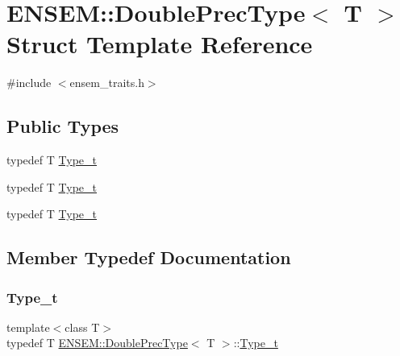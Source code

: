 \hypertarget{structENSEM_1_1DoublePrecType}{}\section{E\+N\+S\+EM\+:\+:Double\+Prec\+Type$<$ T $>$ Struct Template Reference}
\label{structENSEM_1_1DoublePrecType}


{\ttfamily \#include $<$ensem\+\_\+traits.\+h$>$}

\subsection*{Public Types}
\begin{DoxyCompactItemize}
\item 
typedef T \mbox{\hyperlink{structENSEM_1_1DoublePrecType_a3ad79cdc343a0aa27abdd8168287bb65}{Type\+\_\+t}}
\item 
typedef T \mbox{\hyperlink{structENSEM_1_1DoublePrecType_a3ad79cdc343a0aa27abdd8168287bb65}{Type\+\_\+t}}
\item 
typedef T \mbox{\hyperlink{structENSEM_1_1DoublePrecType_a3ad79cdc343a0aa27abdd8168287bb65}{Type\+\_\+t}}
\end{DoxyCompactItemize}


\subsection{Member Typedef Documentation}
\mbox{\label{structENSEM_1_1DoublePrecType_a3ad79cdc343a0aa27abdd8168287bb65}} 
\subsubsection{\texorpdfstring{Type\_t}{Type\_t}\hspace{0.1cm}{\footnotesize\ttfamily [1/3]}}
{\footnotesize\ttfamily template$<$class T$>$ \\
typedef T \mbox{\hyperlink{structENSEM_1_1DoublePrecType}{E\+N\+S\+E\+M\+::\+Double\+Prec\+Type}}$<$ T $>$\+::\mbox{\hyperlink{structENSEM_1_1DoublePrecType_a3ad79cdc343a0aa27abdd8168287bb65}{Type\+\_\+t}}}

\mbox{\label{structENSEM_1_1DoublePrecType_a3ad79cdc343a0aa27abdd8168287bb65}} 
